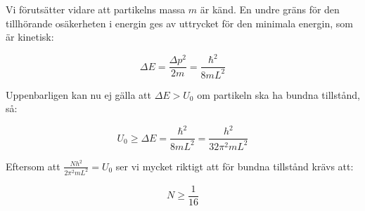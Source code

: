 \documentclass[12pt,a4paper]{article}
\begin{document}
Vi förutsätter vidare att partikelns massa $m$ är känd. En undre gräns för den tillhörande osäkerheten i energin ges av uttrycket för den minimala energin, som är kinetisk:

\begin{equation*}
\Delta E=\frac{\Delta p^2}{2m}=\frac{\hbar^2}{8mL^2}
\end{equation*}

Uppenbarligen kan nu ej gälla att $\Delta E>U_0$ om partikeln ska ha bundna tillstånd, så:

\begin{equation*}
U_0\ge\Delta E=\frac{\hbar^2}{8mL^2}=\frac{h^2}{32\pi^2mL^2}
\end{equation*}

Eftersom att $\frac{Nh^2}{2\pi^2mL^2}=U_0$ ser vi mycket riktigt att för bundna tillstånd krävs att:

\begin{equation*}
N\ge\frac{1}{16}
\end{equation*}
\end{document}
